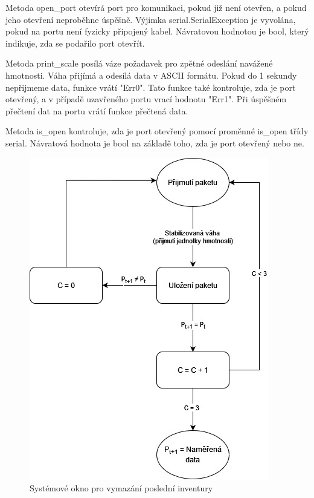 Metoda open\_port otevírá port pro komunikaci, pokud již není otevřen, a pokud jeho otevření neproběhne úspěšně. Výjimka serial.SerialException je vyvolána, pokud na portu není fyzicky připojený kabel. Návratovou hodnotou je bool, který indikuje, zda se podařilo port otevřít.

Metoda print\_scale posílá váze požadavek pro zpětné odeslání navážené hmotnosti. Váha přijímá a odesílá data v ASCII formátu. Pokud do 1 sekundy nepřijmeme data, funkce vrátí "Err0". Tato funkce také kontroluje, zda je port otevřený, a v případě uzavřeného portu vrací hodnotu "Err1". Při úspěšném přečtení dat na portu vrátí funkce přečtená data.

Metoda is\_open kontroluje, zda je port otevřený pomocí proměnné is\_open třídy serial. Návratová hodnota je bool na základě toho, zda je port otevřený nebo ne.

\begin{figure}[!h]
    \begin{center}
        \includegraphics[scale=0.8]{obrazky/stavovy_automat_parita.jpg}
    \end{center}
    \caption{Systémové okno pro vymazání poslední inventury}
    \label{putty}
\end{figure}

